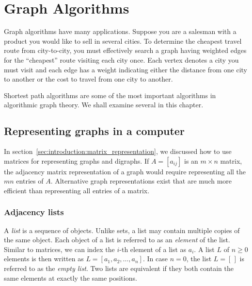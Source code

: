 
\chapter{Graph Algorithms}
\label{chap:graph_algorithms}

Graph algorithms have many applications. Suppose you are a salesman
with a product you would like to sell in several cities. To determine
the cheapest travel route from city-to-city, you must effectively
search a graph having weighted edges for the ``cheapest'' route
visiting each city once. Each vertex denotes a city you must visit and
each edge has a weight indicating either the distance from one city to
another or the cost to travel from one city to another.

Shortest path algorithms are some of the most important algorithms in
algorithmic graph theory. We shall examine several in this chapter.



\section{Representing graphs in a computer}

In section~\ref{sec:introduction:matrix_representation}, we discussed
how to use matrices for representing graphs and digraphs. If
$A = [a_{ij}]$ is an $m \times n$ matrix, the adjacency matrix
representation of a graph would require representing all the $mn$
entries of $A$. Alternative graph representations exist that are much
more efficient than representing all entries of a matrix.



\subsection{Adjacency lists}

A \emph{list} is a sequence of objects. Unlike sets, a list may
contain multiple copies of the same object. Each object of a list is
referred to as an \emph{element} of the list. Similar to matrices, we
can index the $i$-th element of a list as $a_i$. A list $L$ of
$n \geq 0$ elements is then written as
$L = [a_1, a_2, \dots, a_n]$. In case $n = 0$, the list $L = [\,]$ is
referred to as the \emph{empty list}. Two lists are equivalent if they
both contain the same elements at exactly the same positions.

